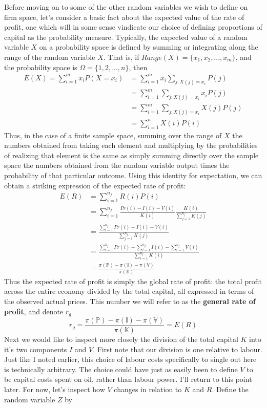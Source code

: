 Before moving on to some of the other random variables we wish to define on firm space, let's consider a basic fact about the expected value of the rate of profit, one which will in some sense vindicate our choice of defining proportions of capital as the probability measure. Typically, the expected value of a random variable $X$ on a probability space is defined by summing or integrating along the range of the random variable $X$. That is, if $Range(X) = \{x_1,x_2,...,x_m\}$, and the probability space is $\Omega = \{1,2,...,n\}$, then
\begin{align}
	E(X) = \sum_{i=1}^m x_i P(X = x_i) &= \sum_{i=1}^m x_i \sum_{j: X(j)=x_i} P(j) \\
	&= \sum_{i=1}^m \sum_{j: X(j)=x_i} x_iP(j) \\
	&=  \sum_{i=1}^m \sum_{j: X(j)=x_i} X(j)P(j) \\
	&= \sum_{i=1}^n X(i)P(i)
\end{align} 
Thus, in the case of a finite sample space, summing over the range of $X$ the numbers obtained from taking each element and multiplying by the probabilities of realizing that element is the same as simply summing directly over the sample space the numbers obtained from the random variable output times the probability of that particular outcome. Using this identity for expectation, we can obtain a striking expression of the expected rate of profit:
\begin{align}
	E(R) &= \sum_{i=1}^{n_f} R(i)P(i) \\
		&= \sum_{i=1}^{n_f} \frac{Pr(i)-I(i)-V(i)}{K(i)}\frac{K(i)}{\sum_{j=1}^{n_f}K(j)} \\
		&= \frac{\sum_{i=1}^{n_f} Pr(i)-I(i)-V(i)}{\sum_{j=1}^{n_f} K(j)} \\
		&= \frac{\sum_{i=1}^{n_f} Pr(i) - \sum_{i=1}^{n_f} I(i) - \sum_{i=1}^{n_f} V(i)}{\sum_{i=1}^{n_f} K(i)} \\
		&= \frac{\pi(\mathbb{P}) - \pi(\mathbb{I}) - \pi(\mathbb{V})}{\pi(\mathbb{K})}
\end{align}
Thus the expected rate of profit is simply the global rate of profit: the total profit across the entire economy divided by the total capital, all expressed in terms of the observed actual prices. This number we will refer to as the \textbf{general rate of profit}, and denote $r_g$ 
\[ r_g = \frac{\pi(\mathbb{P}) - \pi(\mathbb{I}) - \pi(\mathbb{V})}{\pi(\mathbb{K})} = E(R) \]
Next we would like to inspect more closely the division of the total capital $K$ into it's two components $I$ and $V$. First note that our division is one relative to labour. Just like I noted earlier, this choice of labour costs specifically to single out here is technically arbitrary. The choice could have just as easily been to define $V$ to be capital costs spent on oil, rather than labour power. I'll return to this point later. For now, let's inspect how $V$ changes in relation to $K$ and $R$. Define the random variable $Z$ by
